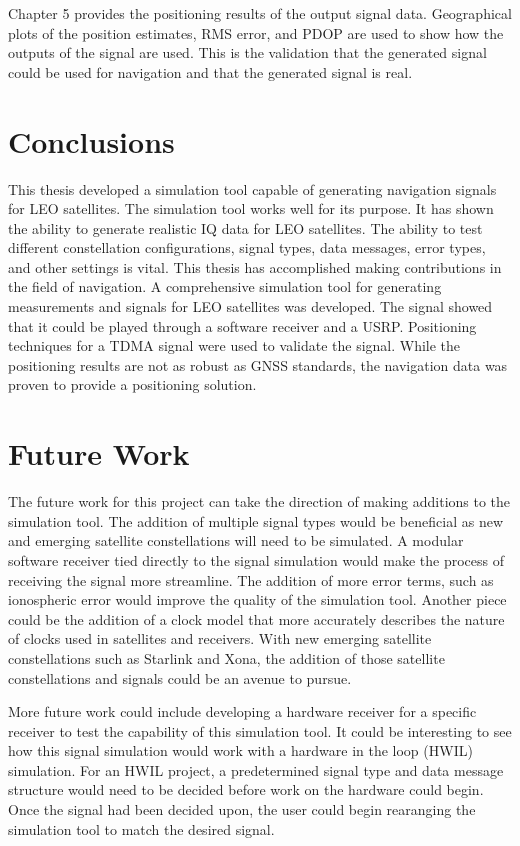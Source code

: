 \documentclass[12pt]{report}
\begin{document}
Chapter 5 provides the positioning results of the output signal data. Geographical plots of the position estimates, RMS error, and PDOP are used to show how the outputs of the signal are used. This is the validation that the generated signal could be used for navigation and that the generated signal is real. 

\section{Conclusions}
This thesis developed a simulation tool capable of generating navigation signals for LEO satellites. The simulation tool works well for its purpose. It has shown the ability to generate realistic IQ data for LEO satellites. The ability to test different constellation configurations, signal types, data messages, error types, and other settings is vital. This thesis has accomplished making contributions in the field of navigation. A comprehensive simulation tool for generating measurements and signals for LEO satellites was developed. The signal showed that it could be played through a software receiver and a USRP. Positioning techniques for a TDMA signal were used to validate the signal. While the positioning results are not as robust as GNSS standards, the navigation data was proven to provide a positioning solution. 


\section{Future Work}
The future work for this project can take the direction of making additions to the simulation tool. The addition of multiple signal types would be beneficial as new and emerging satellite constellations will need to be simulated. A modular software receiver tied directly to the signal simulation would make the process of receiving the signal more streamline. The addition of more error terms, such as ionospheric error would improve the quality of the simulation tool. Another piece could be the addition of a clock model that more accurately describes the nature of clocks used in satellites and receivers. With new emerging satellite constellations such as Starlink and Xona, the addition of those satellite constellations and signals could be an avenue to pursue. 

More future work could include developing a hardware receiver for a specific receiver to test the capability of this simulation tool. It could be interesting to see how this signal simulation would work with a hardware in the loop (HWIL) simulation. For an HWIL project, a predetermined signal type and data message structure would need to be decided before work on the hardware could begin. Once the signal had been decided upon, the user could begin rearanging the simulation tool to match the desired signal. 
\end{document}
